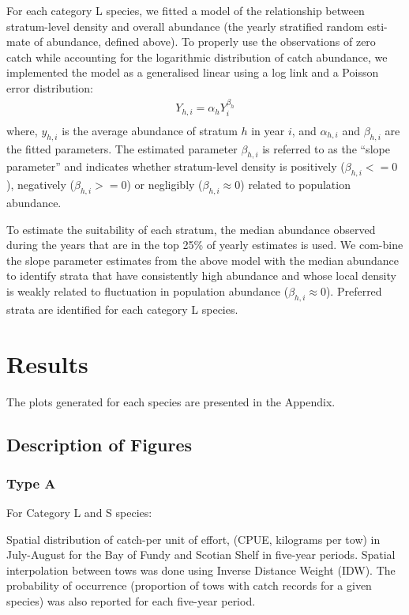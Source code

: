 \documentclass[12pt]{article}\usepackage[]{graphicx}\usepackage[]{color}
\begin{document}
For each category L species, we fitted a model of the relationship between stratum-level density and overall abundance (the yearly stratified random esti-mate of abundance, defined above). To properly use the observations of zero catch while accounting for the logarithmic distribution of catch abundance, we implemented the model as a generalised linear using a log link and a Poisson error distribution:
\begin{eqnarray*}\label{eqHabitat Selection}
Y_{h,i} = \alpha_{h} Y_{i}^{\beta_h}
\\
\end{eqnarray*}
where, \(y_{h,i}\) is the average abundance of stratum \(h\) in year \(i\), and \(\alpha_{h,i}\) and \(\beta_{h,i}\) are the fitted parameters. The estimated parameter \(\beta_{h,i}\) is referred to as the ``slope parameter'' and indicates whether stratum-level density is positively (\(\beta_{h,i} <= 0\)), negatively (\(\beta_{h,i} >= 0\)) or negligibly (\(\beta_{h,i} \approx 0\)) related to population abundance.

To estimate the suitability of each stratum, the median abundance observed during the years that are in the top 25\% of yearly estimates is used. We com-bine the slope parameter estimates from the above model with the median abundance to identify strata that have consistently high abundance and whose local density is weakly related to fluctuation in population abundance (\(\beta_{h,i} \approx 0\)). Preferred strata are identified for each category L species.

\section{Results}\label{results}

The plots generated for each species are presented in the Appendix.

\subsection{Description of Figures}\label{description-of-figures}

\subsubsection{Type A}\label{type-a}

For Category L and S species:

Spatial distribution of catch-per unit of eﬀort, (CPUE, kilograms per tow) in July-August for the Bay of Fundy and Scotian Shelf in five-year periods. Spatial interpolation between tows was done using Inverse Distance Weight (IDW). The probability of occurrence (proportion of tows with catch records for a given species) was also reported for each five-year period.
\end{document}
